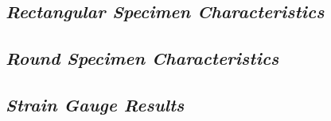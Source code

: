 \documentclass[11pt,a4paper]{article}
\numberwithin{equation}{subsection}
\begin{document}
\pagebreak	




\pagebreak
\cleardoublepage
{}

\appendixtitleon

\begin{appendices}
	\section{\textit{Rectangular Specimen Characteristics}}
\pagebreak

\end{appendices}

\begin{appendices}
	\section{\textit{Round Specimen Characteristics}}
	\pagebreak
	
\end{appendices}

\begin{appendices}
	\section{\textit{Strain Gauge Results}}


	\pagebreak
	
\end{appendices}
\end{document}
